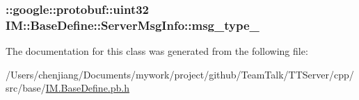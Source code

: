 \subsubsection[{msg\+\_\+type\+\_\+}]{\setlength{\rightskip}{0pt plus 5cm}\+::google\+::protobuf\+::uint32 I\+M\+::\+Base\+Define\+::\+Server\+Msg\+Info\+::msg\+\_\+type\+\_\+\hspace{0.3cm}{\ttfamily [private]}}\label{class_i_m_1_1_base_define_1_1_server_msg_info_ab1f01d60d5666231a7ed9dce9d8343cd}


The documentation for this class was generated from the following file\+:\begin{DoxyCompactItemize}
\item 
/\+Users/chenjiang/\+Documents/mywork/project/github/\+Team\+Talk/\+T\+T\+Server/cpp/src/base/\hyperlink{_i_m_8_base_define_8pb_8h}{I\+M.\+Base\+Define.\+pb.\+h}\end{DoxyCompactItemize}
